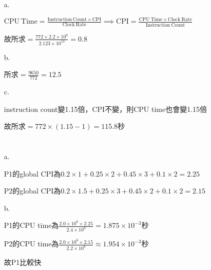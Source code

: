 \documentclass{article}
\begin{document}
\section{}

\begin{enumerate}
    \item[a.]

        \(\displaystyle
        \mathrm{CPU\ Time} = \frac{\mathrm{Instruction\ Count} \times \mathrm{CPI}}{\mathrm{Clock\ Rate}}
        \implies \mathrm{CPI} = \frac{\mathrm{CPU\ Time} \times \mathrm{Clock\ Rate}}{\mathrm{Instruction\ Count}}
        \)

        故所求\(\displaystyle
        = \frac{772 \times 2.2 \times 10^9}{2.123 \times 10^{12}}
        = 0.8\)

    \item[b.]

        所求\(\displaystyle
        = \frac{9650}{772}
        = 12.5
        \)

    \item[c.]

        instruction count變1.15倍，CPI不變，則CPU time也會變1.15倍

        故所求\(= 772 \times (1.15 - 1) = 115.8\)秒

\end{enumerate}

\section{}

\begin{enumerate}
    \item[a.]

        P1的global CPI為\(0.2 \times 1 + 0.25 \times 2 + 0.45 \times 3 + 0.1 \times 2 = 2.25\)

        P2的global CPI為\(0.2 \times 1.5 + 0.25 \times 3 + 0.45 \times 2 + 0.1 \times 2 = 2.15\)

    \item[b.]

        P1的CPU time為\(\displaystyle
        \frac{2.0 \times 10^6 \times 2.25}{2.4 \times 10^9}
        = 1.875 \times 10^{-3}
        \)秒

        P2的CPU time為\(\displaystyle
        \frac{2.0 \times 10^6 \times 2.15}{2.2 \times 10^9}
        \approx 1.954 \times 10^{-3}
        \)秒

        故P1比較快

\end{enumerate}
\end{document}
